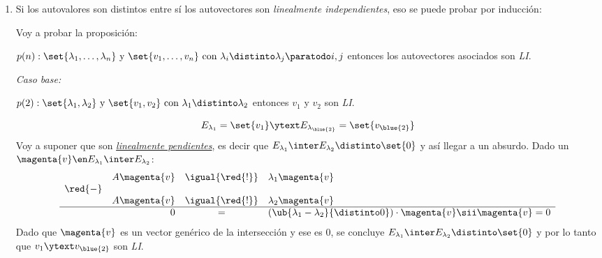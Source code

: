 \begin{enumerate}[label=\alph*)]
  \item Si los autovalores son distintos entre sí los autovectores son \textit{linealmente independientes}, eso
        se puede probar por inducción:

        Voy a probar la proposición:
        \begin{center}
          $p(n):
            \set{\lambda_1, \ldots, \lambda_n}
            \text{ y }
            \set{v_1, \ldots, v_n}
            \text{ con } \lambda_i \distinto \lambda_j \paratodo i, j$
          entonces los autovectores asociados son \textit{LI}.
        \end{center}

        \bigskip

        \textit{Caso base:}
        \begin{center}
          $p(2):
            \set{\lambda_1, \lambda_2}
            \text{ y }
            \set{v_1, v_2}
            \text{ con } \lambda_1 \distinto \lambda_2$
          entonces $v_1$ y $v_2$ son \textit{LI}.
        \end{center}
        $$
          E_{\lambda_1} = \set{v_1}
          \ytext
          E_{\lambda_{\blue{2}}} = \set{v_{\blue{2}}}
        $$
        Voy a suponer que son \textit{\underline{linealmente pendientes}}, es decir que
        $E_{\lambda_1} \inter E_{\lambda_2} \distinto \set{0}$ y así llegar a un absurdo.
        Dado un $\magenta{v} \en E_{\lambda_1} \inter E_{\lambda_2}$:
        $$
          \begin{array}{rrcl}
                    & A\magenta{v} & \igual{\red{!}} & \lambda_1 \magenta{v}                                                            \\
            \red{-} &              &                 &                                                                                  \\
                    & A\magenta{v} & \igual{\red{!}} & \lambda_2 \magenta{v}                                                            \\\hline
                    & 0            & =               & (\ub{\lambda_1 - \lambda_2}{\distinto 0}) \cdot \magenta{v} \sii \magenta{v} = 0
          \end{array}
        $$
        Dado que $\magenta{v}$ es un vector genérico de la intersección y ese es 0,
        se concluye $E_{\lambda_1} \inter E_{\lambda_2} \distinto \set{0}$ y por lo tanto que
        $v_1 \ytext v_{\blue{2}}$ son \textit{LI}.


\end{enumerate}
